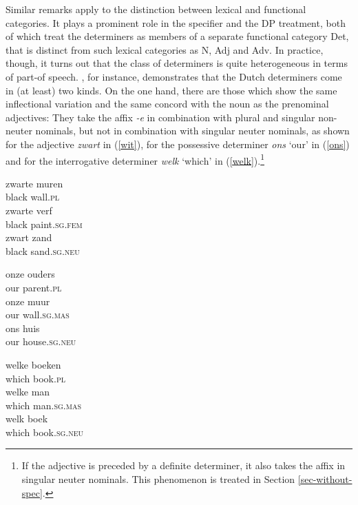 \documentclass[output=paper
                ,modfonts
                ,nonflat
	        ,collection
	        ,collectionchapter
	        ,collectiontoclongg
 	        ,biblatex
                ,babelshorthands
                ,newtxmath
                ,draftmode
                ,colorlinks, citecolor=brown
]{./langsci/langscibook}
\begin{document}
Similar remarks apply to the distinction between lexical and functional categories. 
It plays a prominent role in the specifier and the DP treatment, both of which treat the 
determiners as members of a separate functional category Det, that is distinct from 
such lexical categories as N, Adj and Adv.
In practice, though, it turns out that the class of determiners is quite heterogeneous in 
terms of part-of speech. \citep{VanEynde06}, for instance, demonstrates that the 
Dutch determiners come in (at least) two kinds. On the one hand, there are those 
which show the same inflectional variation and the same concord with the noun as the 
prenominal adjectives: They take the affix \emph{-e} in combination with plural 
and singular non-neuter nominals, but not in combination with singular 
neuter nominals, as shown for the adjective \emph{zwart} in (\ref{wit}), 
for the possessive determiner \emph{ons} `our' in (\ref{ons}) and for the 
interrogative determiner \emph{welk} `which' in (\ref{welk}).\footnote{If the adjective 
is preceded by a definite determiner, 
it also takes the affix in singular neuter nominals. This phenomenon is treated 
in Section \ref{sec-without-spec}.} 

\begin{exe} 
\ex\label{wit} 
\begin{xlist}
\ex
\gll  zwarte muren      \\
      black wall.\textsc{pl} \\
\ex
\gll  zwarte verf \\
      black paint.\textsc{sg.fem} \\
\ex
\gll  zwart zand \\
      black sand.\textsc{sg.neu} \\
\end{xlist}
\ex\label{ons}
\begin{xlist}
\ex
\gll onze ouders     \\
     our parent.\textsc{pl}  \\
\ex
\gll onze muur     \\
     our wall.\textsc{sg.mas}  \\
\ex
\gll ons huis     \\
     our house.\textsc{sg.neu}  \\
\end{xlist}
\ex\label{welk}
\begin{xlist} 
\ex
\gll welke boeken  \\
     which book.\textsc{pl} \\
\ex
\gll welke man                 \\
     which man.\textsc{sg.mas}  \\
\ex
\gll welk boek   \\
     which book.\textsc{sg.neu} \\
\end{xlist}
\end{exe} 
\end{document}
